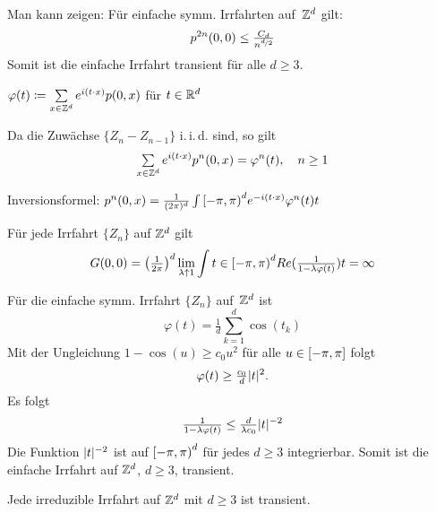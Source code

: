\documentclass{cheat-sheet}
\newcommand{\iid}{i.\,i.\,d.} %
\begin{document}

\begin{bem}
  Man kann zeigen:
  Für einfache symm. Irrfahrten auf~$\mathbb{Z}^d$ gilt:
  \[ p^{2n}(0,0) \leq \tfrac{C_d}{n^{\nicefrac{d}{2}}} \]
  Somit ist die einfache Irrfahrt transient für alle $d \geq 3$.
\end{bem}

\begin{defn}
  $\varphi(t) \coloneqq \sum_{x \in \Z^d} e^{i (t \cdot x)} p(0, x)$ für $t \in \mathbb{R}^d$
\end{defn}

Da die Zuwächse $\{ Z_n - Z_{n-1} \}$ \iid{} sind, so gilt
\[ \sum_{x \in \Z^d} e^{i (t \cdot x)} p^{n}(0, x) = \varphi^n(t), \quad n \geq 1 \]

Inversionsformel: $p^{n}(0, x) = \tfrac{1}{(2 \pi)^d} \int{\left[ -\pi, \pi \right)^d}{}{e^{- i (t \cdot x)} \varphi^n(t)}{t}$

\begin{satz}
  Für jede Irrfahrt $\{ Z_n \}$ auf $\mathbb{Z}^d$ gilt
  \[ G(0, 0) = \left( \tfrac{1}{2 \pi} \right)^d \lim_{\lambda \uparrow 1} \int{t \in \left[ -\pi, \pi \right)^d}{}{Re(\tfrac{1}{1 - \lambda \varphi(t)})}{t} = \infty \]
\end{satz}

\begin{bsp}
  Für die einfache symm. Irrfahrt $\{ Z_n \}$ auf~$\mathbb{Z}^d$ ist
  \[
    \varphi(t) = \tfrac{1}{d} \sum_{k=1}^d \cos(t_k)
  \]
  Mit der Ungleichung $1 - \cos(u) \geq c_0 u^2$ für alle $u \in \left[ - \pi, \pi \right]$ folgt
  \[
    \varphi(t) \geq \tfrac{c_0}{d} \lvert t\rvert^2.
  \]
  Es folgt
  \[
    \tfrac{1}{1 - \lambda \varphi(t)} \leq \tfrac{d}{\lambda c_0} \lvert t\rvert^{-2}
  \]
  Die Funktion $\lvert t\rvert^{-2}$ ist auf $\left[ -\pi, \pi \right)^d$ für jedes $d \geq 3$ integrierbar.
  Somit ist die einfache Irrfahrt auf $\mathbb{Z}^d$, $d \geq 3$, transient.
\end{bsp}

\begin{satz}
  Jede irreduzible Irrfahrt auf $\mathbb{Z}^d$ mit $d \geq 3$ ist transient.
\end{satz}
\end{document}
